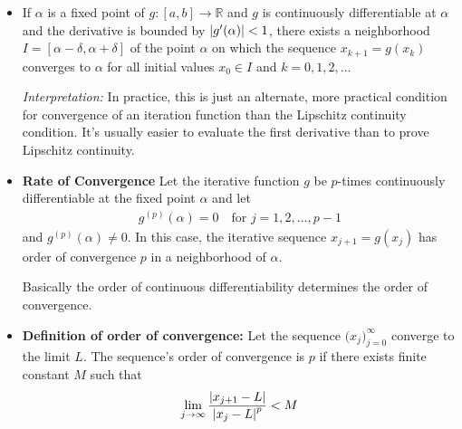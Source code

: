 \documentclass[11pt, a4paper]{article}
\newcommand{\R}{\mathbb{R}} %
\begin{document}
\begin{itemize}
	\item If $\alpha$ is a fixed point of $ g: [a, b] \to \R $ and $ g $ is continuously differentiable at $ \alpha $ and the derivative is bounded by $ \abs{g'(\alpha)} < 1$, there exists a neighborhood $ I = [\alpha - \delta, \alpha + \delta] $ of the point $ \alpha $ on which the sequence $ x_{k + 1} = g(x_{k}) $ converges to $ \alpha $ for all initial values $ x_{0} \in I $ and $ k = 0, 1, 2, \ldots $
	
	\textit{Interpretation:} In practice, this is just an alternate, more practical condition for convergence of an iteration function than the Lipschitz continuity condition. It's usually easier to evaluate the first derivative than to prove Lipschitz continuity. 
	
	
	\item \textbf{Rate of Convergence} Let the iterative function $ g $ be $ p $-times continuously differentiable at the fixed point $ \alpha $ and let 
	\begin{align*}
		 g^{(p)} (\alpha) = 0 \quad \text{for } j = 1, 2, \dots, p-1
	\end{align*}
	and $ g^{(p)}(\alpha) \neq 0 $. In this case, the iterative sequence $ x_{j+1} = g(x_j) $ has order of convergence $ p $ in a neighborhood of $ \alpha $.
	
	Basically the order of continuous differentiability determines the order of convergence.
	
	\item \textbf{Definition of order of convergence:} Let the sequence $ \displaystyle{\big( x_{j} \big)_{j=0}^{\infty}} $ converge to the limit $ L $. The sequence's order of convergence is $ p $ if there exists finite constant $ M $ such that
	\begin{align*}
		\lim_{j \to \infty} \frac{\abs{x_{j+1} - L}}{\abs{x_{j} - L}^{p}} < M
	\end{align*}
	 
\end{itemize}
\end{document}
